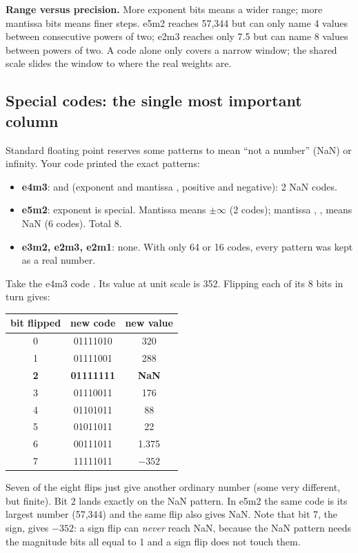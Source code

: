 \textbf{Range versus precision.} More exponent bits means a wider range; more mantissa bits means finer steps.
e5m2 reaches 57{,}344 but can only name 4 values between consecutive powers of two; e2m3 reaches only 7.5 but
can name 8 values between powers of two. A code alone only covers a narrow window; the shared scale slides
the window to where the real weights are.

\subsection{Special codes: the single most important column}
Standard floating point reserves some patterns to mean ``not a number'' (NaN) or infinity. Your code printed
the exact patterns:
\begin{itemize}
\item \textbf{e4m3}:  and  (exponent  and mantissa , positive and negative):
 2 NaN codes.
\item \textbf{e5m2}: exponent  is special. Mantissa  means $\pm\infty$ (2 codes); mantissa
 , ,  means NaN (6 codes). Total 8.
\item \textbf{e3m2, e2m3, e2m1}: none. With only 64 or 16 codes, every pattern was kept as a real number.
\end{itemize}

\begin{worked}
Take the e4m3 code . Its value at unit scale is 352. Flipping each of its 8 bits in turn gives:

\smallskip
\begin{center}\small
\begin{tabular}{ccc}
\toprule
bit flipped & new code & new value \\
\midrule
0 & 01111010 & 320 \\
1 & 01111001 & 288 \\
\textbf{2} & \textbf{01111111} & \textbf{NaN} \\
3 & 01110011 & 176 \\
4 & 01101011 & 88 \\
5 & 01011011 & 22 \\
6 & 00111011 & 1.375 \\
7 & 11111011 & $-352$ \\
\bottomrule
\end{tabular}
\end{center}
Seven of the eight flips just give another ordinary number (some very different, but finite). Bit 2
lands exactly on the NaN pattern. In e5m2 the same code is its largest number (57{,}344) and the same flip also
gives NaN. Note that bit 7, the sign, gives $-352$: a sign flip can \emph{never} reach NaN, because the NaN
pattern needs the magnitude bits all equal to 1 and a sign flip does not touch them.
\end{worked}

